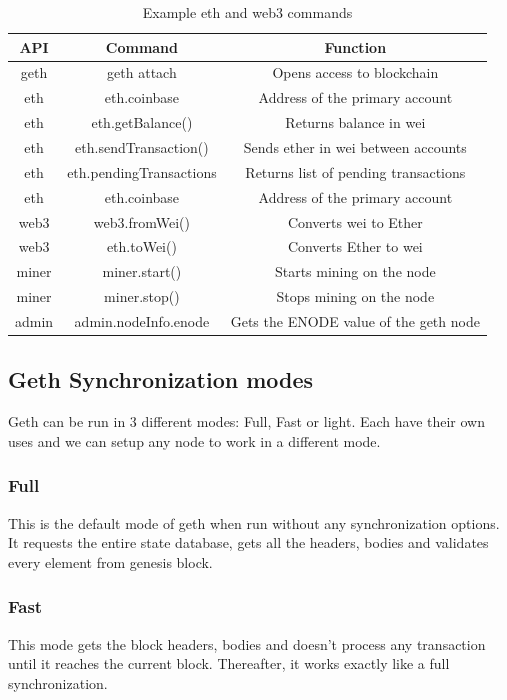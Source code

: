 \documentclass[11pt,openright]{report}
\begin{document}
\begin{table}[!htbp]
	\renewcommand{\arraystretch}{1.3}
	\caption{Example eth and web3 commands}
	\label{geth_commands}
	\centering
	\begin{tabular}{|c|c|c|}
		\hline
		\bfseries API & \bfseries Command & \bfseries Function \\
		\hline\hline
		geth & geth attach & Opens access to blockchain \\ \hline
		eth & eth.coinbase & Address of the primary account \\ \hline
		eth & eth.getBalance() & Returns balance in wei \\ \hline
        eth & eth.sendTransaction() & Sends ether in wei between accounts \\ \hline
        eth & eth.pendingTransactions & Returns list of pending transactions\\ \hline
        eth & eth.coinbase & Address of the primary account \\ \hline
        web3 & web3.fromWei() & Converts wei to Ether \\ \hline
        web3 & eth.toWei() & Converts Ether to wei \\ \hline
        miner & miner.start() & Starts mining on the node \\ \hline
        miner & miner.stop() & Stops mining on the node \\ \hline
        admin & admin.nodeInfo.enode & Gets the ENODE value of the geth node \\ \hline
	\end{tabular}
\end{table}

\newpage
\subsection{Geth Synchronization modes}
Geth can be run in 3 different modes: Full, Fast or light. Each have their own uses and we can setup any node to work in a different mode. 

\subsubsection{Full} 
This is the default mode of geth when run without any synchronization options. It requests the entire state database, gets all the headers, bodies and validates every element from genesis block.

\subsubsection{Fast}
This mode gets the block headers, bodies and doesn't process any transaction until it reaches the current block. Thereafter, it works exactly like a full synchronization.
\end{document}
